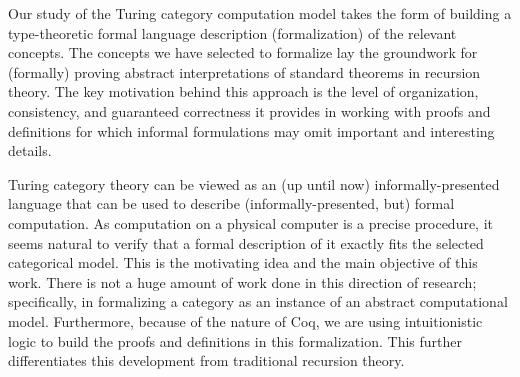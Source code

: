 \documentclass{entcs} \usepackage{entcsmacro}
\begin{document}
Our study of the Turing category computation model takes the form of building a type-theoretic formal language description (formalization) of the relevant concepts. The concepts we have selected to formalize lay the groundwork for (formally) proving abstract interpretations of standard theorems in recursion theory. The key motivation behind  this approach is the level of organization, consistency, and guaranteed correctness it provides in working with proofs and definitions for which informal formulations may omit important and interesting details. 


Turing category theory can be viewed as an (up until now) informally-presented language that can be used to describe (informally-presented, but) formal computation. As computation on a physical computer is a precise procedure, it seems natural to verify that a formal description of it exactly fits the selected categorical model. This is the motivating idea and the main objective of this work. There is not a huge amount of work done in this direction of research; specifically, in formalizing a category as an instance of an abstract computational model. Furthermore, because of the nature of Coq, we are using intuitionistic logic to build the proofs and definitions in this formalization.  This further differentiates this development from traditional recursion theory.   

\end{document}
